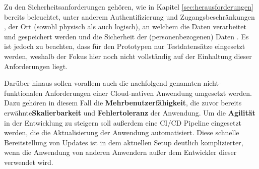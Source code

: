 Zu den Sicherheitsanforderungen gehören, wie in Kapitel \ref{sec:herausforderungen} bereits beleuchtet, unter anderem Authentifizierung und Zugangsbeschränkungen \cite[Vgl.][S. 695]{Kumar2018}, der Ort (sowohl physisch als auch logisch), an welchem die Daten verarbeitet und gespeichert werden \cite[Vgl.][S. 696]{Kumar2018} und die Sicherheit der (personenbezogenen) Daten \cite[Vgl.][S. 696]{Kumar2018}. Es ist jedoch zu beachten, dass für den Prototypen nur Testdatensätze eingesetzt werden, weshalb der Fokus hier noch nicht vollständig auf der Einhaltung dieser Anforderungen liegt.


Darüber hinaus sollen vorallem auch die nachfolgend genannten nicht-funktionalen Anforderungen einer Cloud-nativen Anwendung umgesetzt werden. Dazu gehören in diesem Fall die \textbf{Mehrbenutzerfähigkeit}, die zuvor bereits erwähnte\textbf{Skalierbarkeit} und \textbf{Fehlertoleranz} der Anwendung. Um die \textbf{Agilität} in der Entwicklung zu steigern soll außerdem eine CI/CD Pipeline eingesetzt werden, die die Aktualisierung der Anwendung automatisiert. Diese schnelle Bereitstellung von Updates ist in dem aktuellen Setup deutlich komplizierter, wenn die Anwendung von anderen Anwendern außer dem Entwickler dieser verwendet wird.

\pagebreak